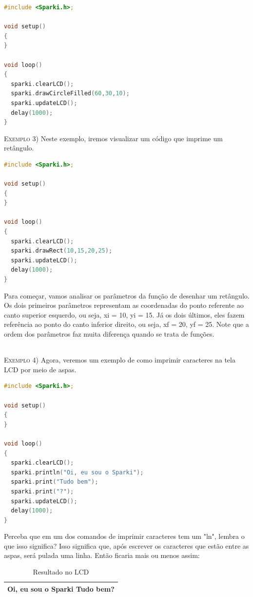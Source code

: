 \begin{lstlisting}[language=C]
#include <Sparki.h>;

void setup()
{
}

void loop()
{
  sparki.clearLCD();
  sparki.drawCircleFilled(60,30,10);
  sparki.updateLCD();
  delay(1000);  
}
\end{lstlisting}

\textsc{Exemplo 3)} Neste exemplo, iremos visualizar um código que imprime um retângulo. 


\begin{lstlisting}[language=C]
#include <Sparki.h>;

void setup()
{
}

void loop()
{
  sparki.clearLCD();
  sparki.drawRect(10,15,20,25);
  sparki.updateLCD();
  delay(1000);  
}
\end{lstlisting}

Para começar, vamos analisar os parâmetros da função de desenhar um retângulo. Os dois primeiros parâmetros representam as coordenadas do ponto referente ao canto superior esquerdo, ou seja, xi = 10, yi = 15. Já os dois últimos, eles fazem referência ao ponto do canto inferior direito, ou seja, xf = 20, yf = 25. Note que a ordem dos parâmetros faz muita diferença quando se trata de funções.
\\~\\
\par \textsc{Exemplo 4)} Agora, veremos um exemplo de como imprimir caracteres na tela LCD por meio de aspas.
\begin{lstlisting}[language=C]
#include <Sparki.h>;

void setup()
{
}

void loop()
{
  sparki.clearLCD();
  sparki.println("Oi, eu sou o Sparki");
  sparki.print("Tudo bem");
  sparki.print("?");
  sparki.updateLCD();
  delay(1000);  
}
\end{lstlisting}

Perceba que em um dos comandos de imprimir caracteres tem um "ln", lembra o que isso significa? Isso significa que, após escrever os caracteres que estão entre as aspas, será pulada uma linha. Então ficaria mais ou menos assim:

\begin{table}[h]
 \centering
 {\renewcommand\arraystretch{1.5}
 \caption{Resultado no LCD}
 \begin{tabular}{ l }
  \cline{1-1}  
    \multicolumn{1}{|p{3.333cm}|}{Oi, eu sou o Sparki       Tudo bem?}
  \\  
  \hline
 \end{tabular} }
\end{table}

